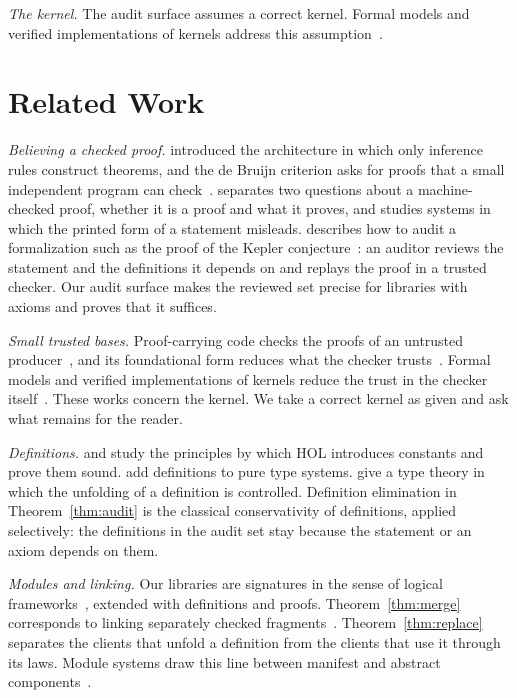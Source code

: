 \documentclass[acmsmall,nonacm,screen]{acmart}
\begin{document}
\emph{The kernel.} The audit surface assumes a correct kernel. Formal models and verified
implementations of kernels address this
assumption~\citep{harrison2006,kumar2014,candle2022,sozeau2020,carneiro2024}.

\section{Related Work}
\label{sec:related}

\emph{Believing a checked proof.} \citet{lcf1979} introduced the architecture in which only
inference rules construct theorems, and the de Bruijn criterion asks for proofs that a small
independent program can check~\citep{barendregt2005,geuvers2009}. \citet{pollack1998} separates
two questions about a machine-checked proof, whether it is a proof and what it proves, and
\citet{wiedijk2012} studies systems in which the printed form of a statement misleads.
\citet{adams2016} describes how to audit a formalization such as the proof of the Kepler
conjecture~\citep{hales2017}: an auditor reviews the statement and the definitions it depends on
and replays the proof in a trusted checker. Our audit surface makes the reviewed set precise for
libraries with axioms and proves that it suffices.

\emph{Small trusted bases.} Proof-carrying code checks the proofs of an untrusted
producer~\citep{necula1997}, and its foundational form reduces what the checker
trusts~\citep{appel2001,appel2003}. Formal models and verified implementations of kernels reduce
the trust in the checker itself~\citep{harrison2006,kumar2014,candle2022,sozeau2020,carneiro2024}.
These works concern the kernel. We take a correct kernel as given and ask what remains for the
reader.

\emph{Definitions.} \citet{kumar2014} and \citet{arthan2014} study the principles by which HOL
introduces constants and prove them sound. \citet{severi1994} add definitions to pure type
systems. \citet{gratzer2022} give a type theory in which the unfolding of a definition is
controlled. Definition elimination in Theorem~\ref{thm:audit} is the classical conservativity of
definitions, applied selectively: the definitions in the audit set stay because the statement or
an axiom depends on them.

\emph{Modules and linking.} Our libraries are signatures in the sense of logical
frameworks~\citep{harper1993}, extended with definitions and proofs. Theorem~\ref{thm:merge}
corresponds to linking separately checked fragments~\citep{cardelli1997}.
Theorem~\ref{thm:replace} separates the clients that unfold a definition from the clients that
use it through its laws. Module systems draw this line between manifest and abstract
components~\citep{leroy1994}.
\end{document}
